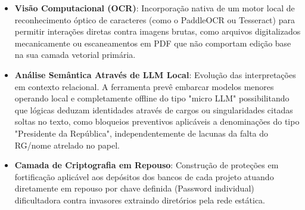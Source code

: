 \documentclass{scrreprt}
\begin{document}
\begin{itemize}
    \item \textbf{Visão Computacional (OCR)}: Incorporação nativa de um motor local de reconhecimento óptico de caracteres (como o PaddleOCR ou Tesseract) para permitir interações diretas contra imagens brutas, como arquivos digitalizados mecanicamente ou escaneamentos em PDF que não comportam edição base na sua camada vetorial primária.
    \item \textbf{Análise Semântica Através de LLM Local}: Evolução das interpretações em contexto relacional. A ferramenta prevê embarcar modelos menores operando local e completamente offline do tipo "micro LLM" possibilitando que lógicas deduzam identidades através de cargos ou singularidades citadas soltas no texto, como bloqueios preventivos aplicáveis a denominações do tipo "Presidente da República", independentemente de lacunas da falta do RG/nome atrelado no papel.
    \item \textbf{Camada de Criptografia em Repouso}: Construção de proteções em fortificação aplicável aos depósitos dos bancos de cada projeto atuando diretamente em repouso por chave definida (Password individual) dificultadora contra invasores extraindo diretórios pela rede estática.
\end{itemize}
\end{document}
